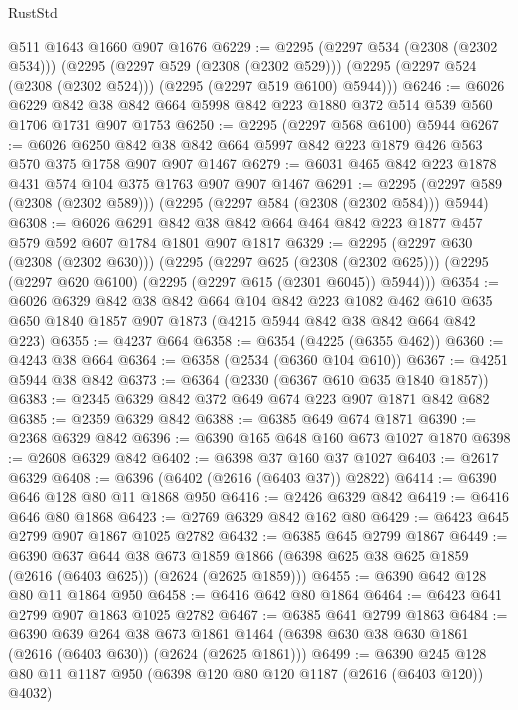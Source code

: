 \begin{lexlean}{RustStd}
\begin{coremodule}
    @511
    @1643
    @1660
    @907
    @1676
@6229 := @2295
    (@2297 @534 (@2308 (@2302 @534)))
    (@2295
      (@2297 @529 (@2308 (@2302 @529)))
      (@2295 (@2297 @524 (@2308 (@2302 @524))) (@2295 (@2297 @519 @6100) @5944)))
@6246 := @6026
    @6229
    @842
    @38
    @842
    @664
    @5998
    @842
    @223
    @1880
    @372
    @514
    @539
    @560
    @1706
    @1731
    @907
    @1753
@6250 := @2295 (@2297 @568 @6100) @5944
@6267 := @6026
    @6250
    @842
    @38
    @842
    @664
    @5997
    @842
    @223
    @1879
    @426
    @563
    @570
    @375
    @1758
    @907
    @907
    @1467
@6279 := @6031 @465 @842 @223 @1878 @431 @574 @104 @375 @1763 @907 @907 @1467
@6291 := @2295 (@2297 @589 (@2308 (@2302 @589))) (@2295 (@2297 @584 (@2308 (@2302 @584))) @5944)
@6308 := @6026
    @6291
    @842
    @38
    @842
    @664
    @464
    @842
    @223
    @1877
    @457
    @579
    @592
    @607
    @1784
    @1801
    @907
    @1817
@6329 := @2295
    (@2297 @630 (@2308 (@2302 @630)))
    (@2295
      (@2297 @625 (@2308 (@2302 @625)))
      (@2295 (@2297 @620 @6100) (@2295 (@2297 @615 (@2301 @6045)) @5944)))
@6354 := @6026
    @6329
    @842
    @38
    @842
    @664
    @104
    @842
    @223
    @1082
    @462
    @610
    @635
    @650
    @1840
    @1857
    @907
    @1873
    (@4215 @5944 @842 @38 @842 @664 @842 @223)
@6355 := @4237 @664
@6358 := @6354 (@4225 (@6355 @462))
@6360 := @4243 @38 @664
@6364 := @6358 (@2534 (@6360 @104 @610))
@6367 := @4251 @5944 @38 @842
@6373 := @6364 (@2330 (@6367 @610 @635 @1840 @1857))
@6383 := @2345 @6329 @842 @372 @649 @674 @223 @907 @1871 @842 @682
@6385 := @2359 @6329 @842
@6388 := @6385 @649 @674 @1871
@6390 := @2368 @6329 @842
@6396 := @6390 @165 @648 @160 @673 @1027 @1870
@6398 := @2608 @6329 @842
@6402 := @6398 @37 @160 @37 @1027
@6403 := @2617 @6329
@6408 := @6396 (@6402 (@2616 (@6403 @37)) @2822)
@6414 := @6390 @646 @128 @80 @11 @1868 @950
@6416 := @2426 @6329 @842
@6419 := @6416 @646 @80 @1868
@6423 := @2769 @6329 @842 @162 @80
@6429 := @6423 @645 @2799 @907 @1867 @1025 @2782
@6432 := @6385 @645 @2799 @1867
@6449 := @6390
    @637
    @644
    @38
    @673
    @1859
    @1866
    (@6398 @625 @38 @625 @1859 (@2616 (@6403 @625)) (@2624 (@2625 @1859)))
@6455 := @6390 @642 @128 @80 @11 @1864 @950
@6458 := @6416 @642 @80 @1864
@6464 := @6423 @641 @2799 @907 @1863 @1025 @2782
@6467 := @6385 @641 @2799 @1863
@6484 := @6390
    @639
    @264
    @38
    @673
    @1861
    @1464
    (@6398 @630 @38 @630 @1861 (@2616 (@6403 @630)) (@2624 (@2625 @1861)))
@6499 := @6390 @245 @128 @80 @11 @1187 @950 (@6398 @120 @80 @120 @1187 (@2616 (@6403 @120)) @4032)

\end{coremodule}
\end{lexlean}
